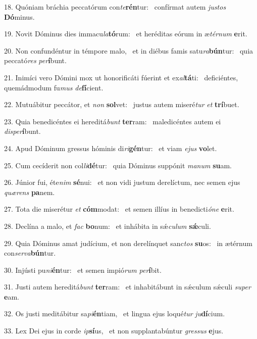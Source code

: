 18. Quóniam bráchia peccatórum con\textit{te}\textbf{rén}tur: \ast\  confírmat autem \textit{jus}\textit{tos} \textbf{Dó}minus.\

19. Novit Dóminus dies immacu\textit{la}\textbf{tó}rum: \ast\  et heréditas eórum in æ\textit{tér}\textit{num} \textbf{e}rit.\

20. Non confundéntur in témpore malo, \dag\  et in diébus famis satu\textit{ra}\textbf{bún}tur: \ast\  quia peccató\textit{res} \textit{per}\textbf{í}bunt.\

21. Inimíci vero Dómini mox ut honorificáti fúerint et ex\textit{al}\textbf{tá}ti: \ast\  deficiéntes, quemádmodum fu\textit{mus} \textit{de}\textbf{fí}cient.\

22. Mutuábitur peccátor, et \textit{non} \textbf{sol}vet: \ast\  justus autem miseré\textit{tur} \textit{et} \textbf{trí}buet.\

23. Quia benedicéntes ei hereditá\textit{bunt} \textbf{ter}ram: \ast\  maledicéntes autem ei \textit{dis}\textit{per}\textbf{í}bunt.\

24. Apud Dóminum gressus hóminis di\textit{ri}\textbf{gén}tur: \ast\  et viam \textit{e}\textit{jus} \textbf{vo}let.\

25. Cum cecíderit non col\textit{li}\textbf{dé}tur: \ast\  quia Dóminus suppónit \textit{ma}\textit{num} \textbf{su}am.\

26. Júnior fui, éte\textit{nim} \textbf{sé}nui: \ast\  et non vidi justum derelíctum, nec semen ejus \textit{quæ}\textit{rens} \textbf{pa}nem.\

27. Tota die miserétur \textit{et} \textbf{cóm}modat: \ast\  et semen illíus in benedicti\textit{ó}\textit{ne} \textbf{e}rit.\

28. Declína a malo, et \textit{fac} \textbf{bo}num: \ast\  et inhábita in sǽ\textit{cu}\textit{lum} \textbf{sǽ}culi.\

29. Quia Dóminus amat judícium, et non derelínquet sanc\textit{tos} \textbf{su}os: \ast\  in ætérnum con\textit{ser}\textit{va}\textbf{bún}tur.\

30. Injústi pu\textit{ni}\textbf{én}tur: \ast\  et semen impió\textit{rum} \textit{per}\textbf{í}bit.\

31. Justi autem hereditá\textit{bunt} \textbf{ter}ram: \ast\  et inhabitábunt in sǽculum sǽculi \textit{su}\textit{per} \textbf{e}am.\

32. Os justi meditábitur sa\textit{pi}\textbf{én}tiam, \ast\  et lingua ejus loqué\textit{tur} \textit{ju}\textbf{dí}cium.\

33. Lex Dei ejus in corde \textit{ip}\textbf{sí}us, \ast\  et non supplantabúntur \textit{gres}\textit{sus} \textbf{e}jus.\

